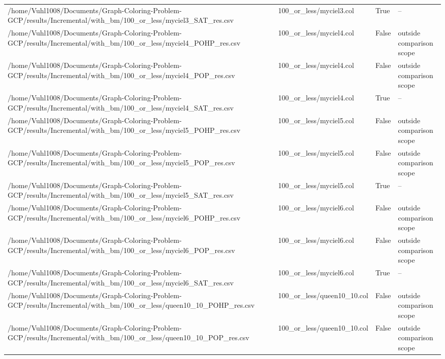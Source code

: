 \begin{table}[htbp]
\begin{tabular}{llll}
/home/Vuhl1008/Documents/Graph-Coloring-Problem-GCP/results/Incremental/with\_bm/100\_or\_less/myciel3\_SAT\_res.csv & 100\_or\_less/myciel3.col & True & -- \\
/home/Vuhl1008/Documents/Graph-Coloring-Problem-GCP/results/Incremental/with\_bm/100\_or\_less/myciel4\_POHP\_res.csv & 100\_or\_less/myciel4.col & False & outside comparison scope \\
/home/Vuhl1008/Documents/Graph-Coloring-Problem-GCP/results/Incremental/with\_bm/100\_or\_less/myciel4\_POP\_res.csv & 100\_or\_less/myciel4.col & False & outside comparison scope \\
/home/Vuhl1008/Documents/Graph-Coloring-Problem-GCP/results/Incremental/with\_bm/100\_or\_less/myciel4\_SAT\_res.csv & 100\_or\_less/myciel4.col & True & -- \\
/home/Vuhl1008/Documents/Graph-Coloring-Problem-GCP/results/Incremental/with\_bm/100\_or\_less/myciel5\_POHP\_res.csv & 100\_or\_less/myciel5.col & False & outside comparison scope \\
/home/Vuhl1008/Documents/Graph-Coloring-Problem-GCP/results/Incremental/with\_bm/100\_or\_less/myciel5\_POP\_res.csv & 100\_or\_less/myciel5.col & False & outside comparison scope \\
/home/Vuhl1008/Documents/Graph-Coloring-Problem-GCP/results/Incremental/with\_bm/100\_or\_less/myciel5\_SAT\_res.csv & 100\_or\_less/myciel5.col & True & -- \\
/home/Vuhl1008/Documents/Graph-Coloring-Problem-GCP/results/Incremental/with\_bm/100\_or\_less/myciel6\_POHP\_res.csv & 100\_or\_less/myciel6.col & False & outside comparison scope \\
/home/Vuhl1008/Documents/Graph-Coloring-Problem-GCP/results/Incremental/with\_bm/100\_or\_less/myciel6\_POP\_res.csv & 100\_or\_less/myciel6.col & False & outside comparison scope \\
/home/Vuhl1008/Documents/Graph-Coloring-Problem-GCP/results/Incremental/with\_bm/100\_or\_less/myciel6\_SAT\_res.csv & 100\_or\_less/myciel6.col & True & -- \\
/home/Vuhl1008/Documents/Graph-Coloring-Problem-GCP/results/Incremental/with\_bm/100\_or\_less/queen10\_10\_POHP\_res.csv & 100\_or\_less/queen10\_10.col & False & outside comparison scope \\
/home/Vuhl1008/Documents/Graph-Coloring-Problem-GCP/results/Incremental/with\_bm/100\_or\_less/queen10\_10\_POP\_res.csv & 100\_or\_less/queen10\_10.col & False & outside comparison scope \\

\end{tabular}
\end{table}
